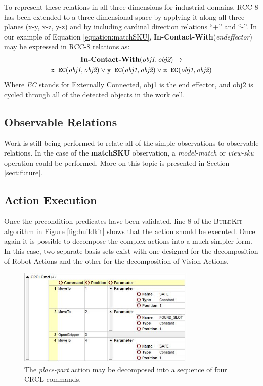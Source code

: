 To represent these relations in all three dimensions for 
industrial domains, RCC-8 has been extended to a three-dimensional space 
by applying it along all three planes (x-y, x-z, y-z) and by including 
cardinal direction relations ``+'' and ``-''. In our example of
Equation \ref{equation:matchSKU}, 
\textbf{In-Contact-With}(\textit{endeffector}) may be expressed
in RCC-8 relations as:
\begin{gather}
\textbf{In-Contact-With}(\textit{obj1}, \textit{obj2}) \rightarrow   \notag\\
\texttt{x-EC}(\textit{obj1}, \textit{obj2}) \vee \texttt{y-EC}(\textit{obj1}, \textit{obj2}) \vee \texttt{z-EC}(\textit{obj1},\textit{obj2}) \notag
\end{gather} 
Where \textit{EC} stands for Externally Connected, obj1 is the end effector, and obj2 is 
cycled through all of the detected objects in the work cell. 
\subsection{Observable Relations}
Work is still being performed to relate all of the simple observations to observable relations. In the case of the \textbf{matchSKU} observation, a \textit{model-match} or \textit{view-sku} operation could be performed. More on this topic is presented in Section \ref{sect:future}.
\subsection{Action Execution}
Once the precondition predicates have been validated, line 8 of the \textsc{BuildKit}
algorithm in Figure \ref{fig:buildkit} shows that the action should be executed. Once
again it is possible to decompose the complex actions into a much simpler form. 
In this case, two separate basis sets exist with one designed for the decomposition 
of Robot Actions and the other for the decomposition of Vision Actions.
%
\begin{figure}[htb!]
\begin{center}
\includegraphics[width=8.5cm]{images/PlacePartCRCL.jpg}
\caption{The \textit{place-part} action may be decomposed into a sequence of
four CRCL commands.} 
\label{fig:PlacePartCRCL}
\end{center}
\end{figure}
%
